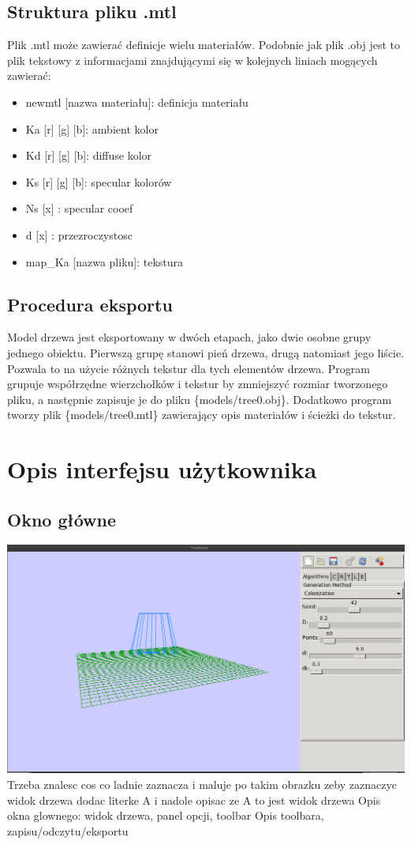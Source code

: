 \subsection{Struktura pliku .mtl}
Plik .mtl może zawierać definicje wielu materiałów. Podobnie jak plik .obj jest to plik tekstowy z informacjami znajdującymi
się w kolejnych liniach mogących zawierać:
\begin{itemize}
\item newmtl [nazwa materiału]: definicja materiału
\item Ka [r] [g] [b]: ambient kolor
\item Kd [r] [g] [b]: diffuse kolor
\item Ks [r] [g] [b]: specular kolorów
\item Ns [x]        : specular cooef
\item d  [x]        : przezroczystosc
\item map\_Ka [nazwa pliku]: tekstura 
\end{itemize}
\subsection{Procedura eksportu}
Model drzewa jest eksportowany w dwóch etapach, jako dwie osobne grupy jednego obiektu. Pierwszą grupę stanowi pień drzewa, drugą natomiast jego liście.
Pozwala to na użycie różnych tekstur dla tych elementów drzewa. Program grupuje współrzędne wierzchołków i tekstur by zmniejszyć rozmiar tworzonego pliku, a następnie
zapisuje je do pliku \{models/tree0.obj\}. Dodatkowo program tworzy plik \{models/tree0.mtl\} zawierający opis materiałów i ścieżki do tekstur. 
\section{Opis interfejsu użytkownika}
\subsection{Okno główne}
{\includegraphics[width=140mm]{images/gui/mainWindow.png}}\\
\vspace{5mm}
Trzeba znalesc cos co ladnie zaznacza i maluje po takim obrazku zeby zaznaczyc widok drzewa dodac literke A i nadole opisac ze A to jest widok drzewa
Opis okna glownego: widok drzewa, panel opcji, toolbar
Opis toolbara, zapisu/odczytu/eksportu

